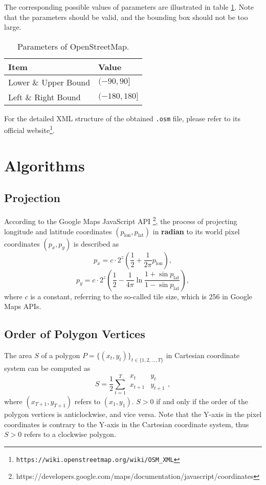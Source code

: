 The corresponding possible values of parameters are illustrated in table \ref{tab:osmapi}. Note that the parameters should be valid, and the bounding box should not be too large.

\begin{table}[!h]
	\centering
	\caption[Parameters of OpenStreetMap]{Parameters of OpenStreetMap.}
	\label{tab:osmapi}
	\begin{tabular}{l|l}
	\hline
	\textbf{Item} & \textbf{Value} \\
	\hline
	Lower \& Upper Bound & $(-90, 90]$ \\
	Left \& Right Bound & $(-180, 180]$ \\
	\hline
	\end{tabular}
\end{table}

For the detailed XML structure of the obtained \lstinline{.osm} file, please refer to  its official website\footnote{\lstinline{https://wiki.openstreetmap.org/wiki/OSM_XML}}.

\chapter{Algorithms}
\section{Projection}\label{app:projec}
According to the Google Maps JavaScript API \footnote{https://developers.google.com/maps/documentation/javascript/coordinates}, the process of projecting longitude and latitude coordinates $(p_{\text{lon}},p_{\text{lat}})$ in \textbf{radian} to its world pixel coordinates $(p_x, p_y)$ is described as
\begin{equation}
p_x = c\cdot2^z(\frac{1}{2}+\frac{1}{2\pi}p_{\text{lon}}),
\end{equation}
\begin{equation}
p_y = c\cdot2^z(\frac{1}{2}-\frac{1}{4\pi}\ln\frac{1+\sin{p_{\text{lat}}}}{1-\sin{p_{\text{lat}}}}),
\end{equation}
where $c$ is a constant, referring to the so-called tile size, which is 256 in Google Maps APIs.

\section{Order of Polygon Vertices}\label{app:revpoly}
The area $S$ of a polygon $P = \{(x_t, y_t)\}_{t \in \{1,2,\ldots,T\}}$ in Cartesian coordinate system can be computed as
\begin{equation}
	S = \frac{1}{2}\sum_{t=1}^{T}\begin{array}{|cc|}
		x_t & y_t \\
		x_{t+1} & y_{t+1} \\
	\end{array},
\end{equation}
where $(x_{T+1}, y_{T+1})$ refers to $(x_1, y_1)$. $S > 0$ if and only if the order of the polygon vertices is anticlockwise, and vice versa. Note that the Y-axis in the pixel coordinates is contrary to the Y-axis in the Cartesian coordinate system, thus $S > 0$ refers to a clockwise polygon.

